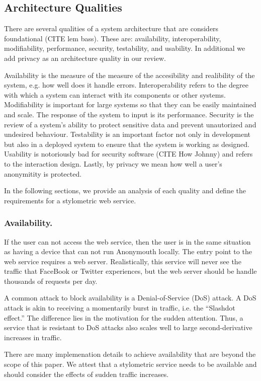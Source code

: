 \documentclass[letterpaper]{article}
\begin{document}
\subsection{Architecture Qualities}
There are several qualities of a system architecture that are
considers foundational (CITE lem bass).  These are: availability,
interoperability, modifiability, performance, security, testability,
and usability.  In additional we add privacy as an architecture
quality in our review.

Availability is the measure of the measure of the accesibility and
realibility of the system, e.g. how well does it handle errors.
Interoperability refers to the degree with which a system can interact
with its components or other systems.  Modifiability is important for
large systems so that they can be easily maintained and scale.  The
response of the system to input is its performance.  Security is the
review of a system's ability to protect sensitive data and prevent
unautorized and undesired behaviour.  Testability is an important
factor not only in development but also in a deployed system to ensure
that the system is working as designed.  Usability is notoriously bad
for security software (CITE How Johnny) and refers to the interaction
design.  Lastly, by privacy we mean how well a user's anonymitity is
protected.

In the following sections, we provide an analysis of each quality and
define the requirements for a stylometric web service.


\subsubsection{Availability.}

If the user can not access the web service, then the user is in the
same situation as having a device that can not run Anonymouth
locally.  The entry point to the web service requires a web server.
Realistically, this service will never see the traffic that FaceBook
or Twitter experiences, but the web server should be handle thousands
of requests per day.

A common attack to block availability is a Denial-of-Service (DoS)
attack.  A DoS attack is akin to receiving a momentarily burst in
traffic, i.e. the ``Slashdot effect.''  The difference lies in the
motivation for the sudden attention.  Thus, a service that is
resistant to DoS attacks also scales well to large second-derivative
increases in traffic.

There are many implemenation details to achieve availability that are
beyond the scope of this paper.  We attest that a stylometric service
needs to be available and should consider the effects of sudden
traffic increases.
\end{document}
